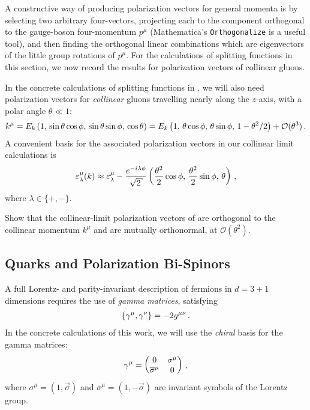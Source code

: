 \begin{subappendices}
A constructive way of producing polarization vectors for general momenta is by selecting two arbitrary four-vectors, projecting each to the component orthogonal to the gauge-boson four-momentum \(p^\mu\) (Mathematica's \texttt{Orthogonalize} is a useful tool), and then finding the orthogonal linear combinations which are eigenvectors of the little group rotations of \(p^\mu\).
%
For the calculations of splitting functions in this section,
we now record the results for polarization vectors of collinear gluons.

\begin{example}
In the concrete calculations of splitting functions in , we will also need polarization vectors for \textit{collinear} gluons travelling nearly along the \(z\)-axis, with a polar angle \(\theta \ll 1\):
\begin{align}
    k^\mu =
    E_k
    \left(1,\, \sin\theta\cos\phi,\, \sin\theta\sin\phi,\,\cos\theta\right)
    =
    E_k
    \left(1,\, \theta\cos\phi,\, \theta\sin\phi,\,1 - \theta^2/2\right)
    +
    \mathcal{O}(\theta^3)
    \,.
\end{align}
A convenient basis for the associated polarization vectors in our collinear limit calculations is
\begin{align}
    \label{eq:collinear-polarization}
    \varepsilon^\mu_\lambda(k)
    \approx
    \varepsilon^\mu_\lambda
    -
    \frac{e^{-i\lambda \phi}}{\sqrt{2}}
    \le(
    \frac{\theta^2}{2}\cos\phi,\,
    \frac{\theta^2}{2}\sin\phi,\,
    \theta
    \ri)
    \,,
\end{align}
where \(\lambda \in \{+,-\}\).
\end{example}

\begin{exercise}
    Show that the collinear-limit polarization vectors of  are orthogonal to the collinear momentum \(k^\mu\) and are mutually orthonormal, at \(\mathcal{O}(\theta^2)\).
\end{exercise}




\subsection{Quarks and Polarization Bi-Spinors}

A full Lorentz- and parity-invariant description of fermions in \(d = 3+1\) dimensions requires the use of \textit{gamma matrices}, satisfying
\begin{align}
    \acomm{\gamma^\mu}{\gamma^\nu} = -2 g^{\mu\nu}
    \,.
\end{align}
%
In the concrete calculations of this work, we will use the \textit{chiral} basis for the gamma matrices:
\begin{align}
    \gamma^\mu = \begin{pmatrix}0 & \sigma^\mu\\\overline{\sigma}^\mu & 0\end{pmatrix}
    \,,
\end{align}
where \(\sigma^\mu = (1, \vec{\sigma})\) and \(\overline{\sigma}^\mu = (1, -\vec{\sigma})\) are invariant symbols of the Lorentz group.



\end{subappendices}
